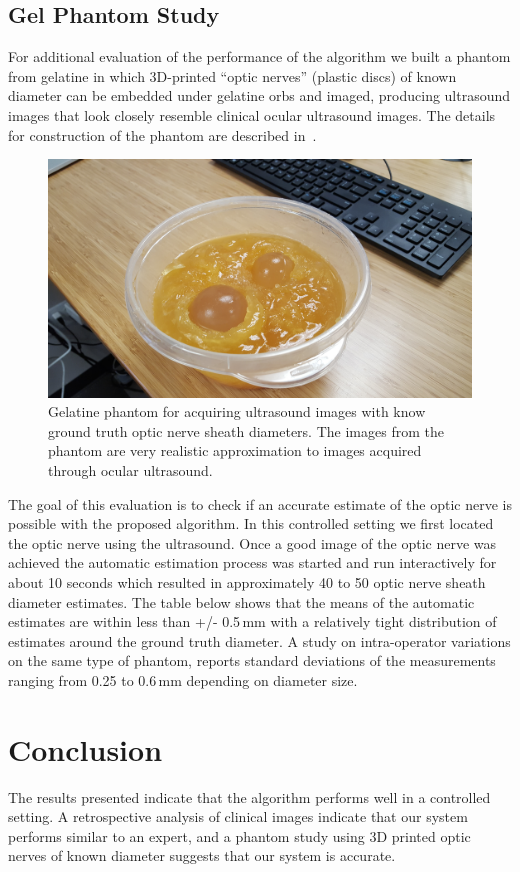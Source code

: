 \documentclass{llncs}
\begin{document}
\subsection{Gel Phantom Study}
For additional evaluation of the performance of the algorithm we built a
phantom from gelatine in which 3D-printed “optic nerves” (plastic discs) of
known diameter can be embedded under gelatine orbs and imaged, producing
ultrasound images that look closely resemble clinical ocular ultrasound images.
The details for construction of the phantom are described in~\cite{Ze2014}.
\begin{figure}
\centering
\includegraphics[width=0.85\linewidth]{phantom.jpg} 
\caption{
\label{fig:phantom}
Gelatine phantom for acquiring ultrasound images with know ground truth optic
nerve sheath diameters. The images from the phantom are very realistic
approximation to images acquired through ocular ultrasound. 
}
\end{figure}

The goal of this evaluation is to check if an accurate estimate of the optic
nerve is possible with the proposed algorithm. In this controlled setting we
first located the optic nerve using the ultrasound. Once a good image of the
optic nerve was achieved the automatic estimation process was started and run
interactively for about 10 seconds which resulted in approximately 40 to 50
optic nerve sheath diameter estimates. The table below shows that the means of
the automatic estimates are within less than +/- 0.5\,mm  with a relatively tight
distribution of estimates around the ground truth diameter. A study on
intra-operator variations on the same type of phantom, reports standard
deviations of the measurements ranging from 0.25 to 0.6\,mm depending on
diameter size.  

\section{Conclusion}
The results presented indicate that the algorithm performs well in a controlled
setting.  A retrospective analysis of clinical images indicate that our system
performs similar to an expert, and a phantom study using 3D printed optic
nerves of known diameter suggests that our system is accurate.
\end{document}

